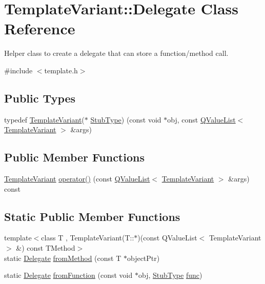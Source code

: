 \hypertarget{class_template_variant_1_1_delegate}{}\section{Template\+Variant\+::Delegate Class Reference}
\label{class_template_variant_1_1_delegate}


Helper class to create a delegate that can store a function/method call.  




{\ttfamily \#include $<$template.\+h$>$}

\subsection*{Public Types}
\begin{DoxyCompactItemize}
\item 
typedef \mbox{\hyperlink{class_template_variant}{Template\+Variant}}($\ast$ \mbox{\hyperlink{class_template_variant_1_1_delegate_ae02c3848db4a42a6bc88f81f5166923a}{Stub\+Type}}) (const void $\ast$obj, const \mbox{\hyperlink{class_q_value_list}{Q\+Value\+List}}$<$ \mbox{\hyperlink{class_template_variant}{Template\+Variant}} $>$ \&args)
\end{DoxyCompactItemize}
\subsection*{Public Member Functions}
\begin{DoxyCompactItemize}
\item 
\mbox{\hyperlink{class_template_variant}{Template\+Variant}} \mbox{\hyperlink{class_template_variant_1_1_delegate_ae9fa32df07f63320a443d949a841945a}{operator()}} (const \mbox{\hyperlink{class_q_value_list}{Q\+Value\+List}}$<$ \mbox{\hyperlink{class_template_variant}{Template\+Variant}} $>$ \&args) const
\end{DoxyCompactItemize}
\subsection*{Static Public Member Functions}
\begin{DoxyCompactItemize}
\item 
{\footnotesize template$<$class T , Template\+Variant(\+T\+::$\ast$)(const Q\+Value\+List$<$ Template\+Variant $>$ \&) const T\+Method$>$ }\\static \mbox{\hyperlink{class_template_variant_1_1_delegate}{Delegate}} \mbox{\hyperlink{class_template_variant_1_1_delegate_a6a013222ab665507469657d09c07c92b}{from\+Method}} (const T $\ast$object\+Ptr)
\item 
static \mbox{\hyperlink{class_template_variant_1_1_delegate}{Delegate}} \mbox{\hyperlink{class_template_variant_1_1_delegate_a226f1f2e20f6d26fea2d989fd91bd8a8}{from\+Function}} (const void $\ast$obj, \mbox{\hyperlink{class_template_variant_1_1_delegate_ae02c3848db4a42a6bc88f81f5166923a}{Stub\+Type}} \mbox{\hyperlink{070__ref__variadic__template_8cpp_abb1e0338f72ae46a1240ada65d6a397c}{func}})
\end{DoxyCompactItemize}


